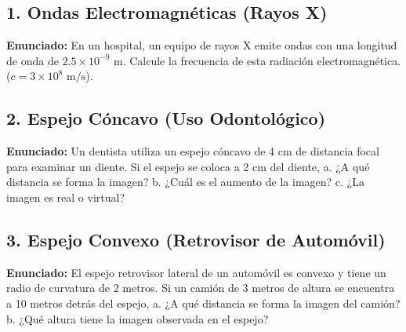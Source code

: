 \documentclass[12pt, letterpaper]{article}
\begin{document}
\subsection*{1. Ondas Electromagnéticas (Rayos X)}
\noindent \textbf{Enunciado:} En un hospital, un equipo de rayos X emite ondas con una longitud de onda de $2.5 \times 10^{-9} \text{ m}$. Calcule la frecuencia de esta radiación electromagnética. ($c = 3 \times 10^8 \text{ m/s}$).


\subsection*{2. Espejo Cóncavo (Uso Odontológico)}
\noindent \textbf{Enunciado:} Un dentista utiliza un espejo cóncavo de 4 cm de distancia focal para examinar un diente. Si el espejo se coloca a 2 cm del diente, a. ¿A qué distancia se forma la imagen? b. ¿Cuál es el aumento de la imagen? c. ¿La imagen es real o virtual?


\subsection*{3. Espejo Convexo (Retrovisor de Automóvil)}
\noindent \textbf{Enunciado:} El espejo retrovisor lateral de un automóvil es convexo y tiene un radio de curvatura de 2 metros. Si un camión de 3 metros de altura se encuentra a 10 metros detrás del espejo, a. ¿A qué distancia se forma la imagen del camión? b. ¿Qué altura tiene la imagen observada en el espejo?
\end{document}
